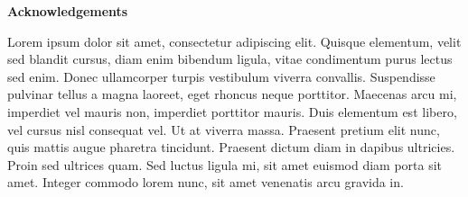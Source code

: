 \thispagestyle{empty}

\begin{center}
\vspace*{4cm}
\textbf{Acknowledgements}
\end{center}

Lorem ipsum dolor sit amet, consectetur adipiscing elit. Quisque elementum, velit sed blandit cursus, diam enim bibendum ligula, vitae condimentum purus lectus sed enim. Donec ullamcorper turpis vestibulum viverra convallis. Suspendisse pulvinar tellus a magna laoreet, eget rhoncus neque porttitor. Maecenas arcu mi, imperdiet vel mauris non, imperdiet porttitor mauris. Duis elementum est libero, vel cursus nisl consequat vel. Ut at viverra massa. Praesent pretium elit nunc, quis mattis augue pharetra tincidunt. Praesent dictum diam in dapibus ultricies. Proin sed ultrices quam. Sed luctus ligula mi, sit amet euismod diam porta sit amet. Integer commodo lorem nunc, sit amet venenatis arcu gravida in.

\newpage
\blankpage